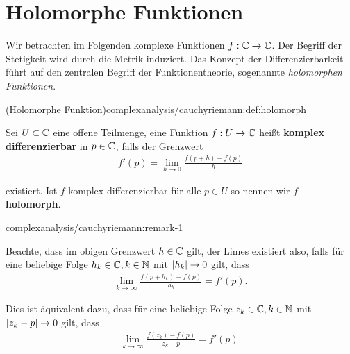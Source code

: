 \section{Holomorphe Funktionen}
\label{\detokenize{complexanalysis/cauchyriemann:holomorphe-funktionen}}\label{\detokenize{complexanalysis/cauchyriemann::doc}}
\par
Wir betrachten im Folgenden komplexe Funktionen \(f:\mathbb{C}\to\mathbb{C}\). Der Begriff der Stetigkeit wird durch die Metrik induziert. Das Konzept der Differenzierbarkeit führt auf den zentralen Begriff der Funktionentheorie, sogenannte \emph{holomorphen Funktionen}.
\begin{definition}{(Holomorphe Funktion)}{complexanalysis/cauchyriemann:def:holomorph}



\par
Sei \(U \subset \mathbb{C}\) eine offene Teilmenge, eine Funktion \(f:U\to\mathbb{C}\) heißt \textbf{komplex differenzierbar} in \(p\in\mathbb{C}\), falls der Grenzwert
\begin{align*}
f'(p) = \lim_{h\rightarrow 0} \frac{f(p+h) - f(p)}{h}
\end{align*}
\par
existiert. Ist \(f\) komplex differenzierbar für alle \(p\in U\) so nennen wir \(f\) \textbf{holomorph}.
\end{definition}
\begin{remark}{}{complexanalysis/cauchyriemann:remark-1}



\par
Beachte, dass im obigen Grenzwert \(h\in\mathbb{C}\) gilt, der Limes existiert also, falls für eine beliebige Folge \(h_k\in\mathbb{C},k\in\mathbb{N}\) mit \(\vert h_k \vert\to 0\) gilt, dass
\begin{align*}
\lim_{k\to\infty} \frac{f(p+h_k) - f(p)}{h_k} = f'(p).
\end{align*}
\par
Dies ist äquivalent dazu, dass für eine beliebige Folge \(z_k\in\mathbb{C},k\in\mathbb{N}\) mit \(\vert z_k-p \vert\to 0\) gilt, dass
\begin{align*}
\lim_{k\to\infty} \frac{f(z_k) - f(p)}{z_k - p} = f'(p).
\end{align*}\end{remark}


